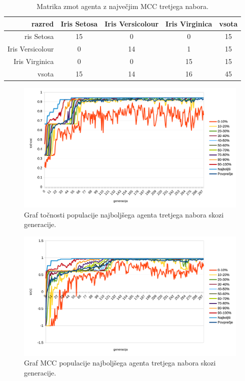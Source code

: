 \begin{table}[H]
    \centering
    \begin{tabular}{||rcccc||}
        \hline
        razred           & Iris Setosa & Iris Versicolour & Iris Virginica & vsota \\ \hline
        ris Setosa       & 15          & 0                & 0              & 15    \\ \hline
        Iris Versicolour & 0           & 14               & 1              & 15    \\ \hline
        Iris Virginica   & 0           & 0                & 15             & 15    \\ \hline
        vsota            & 15          & 14               & 16             & 45    \\ \hline
    \end{tabular}
    \caption{Matrika zmot agenta z največjim MCC tretjega nabora.}
    \label{tab:iris_mcc_3}
\end{table}

\begin{figure}[H]
    \begin{center}
        \includegraphics[width=13cm]{iris/3/acc}
    \end{center}
    \caption{Graf točnosti populacije najboljšega agenta tretjega nabora skozi generacije.}
    \label{fig:iris_acc_3}
\end{figure}

\begin{figure}[H]
    \begin{center}
        \includegraphics[width=13cm]{iris/3/mcc}
    \end{center}
    \caption{Graf MCC populacije najboljšega agenta tretjega nabora skozi generacije.}
    \label{fig:iris_mcc_3}
\end{figure}

